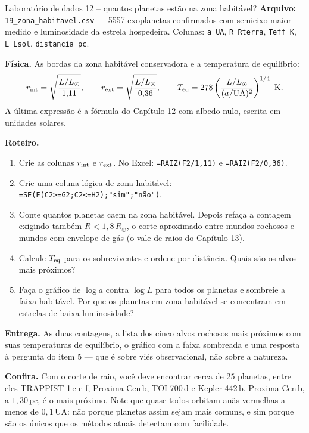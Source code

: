 \documentclass[11pt,a4paper]{article}
\begin{document}
\begin{lessonblock}[borderline west={2pt}{0pt}{astroGold}]{Laboratório de dados 12 -- quantos planetas estão na zona habitável?}
\textbf{Arquivo:} \texttt{19\_zona\_habitavel.csv} --- 5557 exoplanetas confirmados com semieixo maior medido e luminosidade da estrela hospedeira. Colunas: \texttt{a\_UA}, \texttt{R\_Rterra}, \texttt{Teff\_K}, \texttt{L\_Lsol}, \texttt{distancia\_pc}.

\textbf{Física.} As bordas da zona habitável conservadora e a temperatura de equilíbrio:
\[
r_{\rm int}=\sqrt{\frac{L/L_\odot}{1{,}11}},\qquad
r_{\rm ext}=\sqrt{\frac{L/L_\odot}{0{,}36}},\qquad
T_{\rm eq}=278\left(\frac{L/L_\odot}{(a/\mathrm{UA})^{2}}\right)^{1/4}\ \mathrm{K}.
\]
A última expressão é a fórmula do Capítulo 12 com albedo nulo, escrita em unidades solares.

\textbf{Roteiro.}
\begin{enumerate}
\item Crie as colunas $r_{\rm int}$ e $r_{\rm ext}$. No Excel: \texttt{=RAIZ(F2/1,11)} e \texttt{=RAIZ(F2/0,36)}.
\item Crie uma coluna lógica de zona habitável: \texttt{=SE(E(C2>=G2;C2<=H2);"sim";"não")}.
\item Conte quantos planetas caem na zona habitável. Depois refaça a contagem exigindo também $R<1{,}8\,R_\oplus$, o corte aproximado entre mundos rochosos e mundos com envelope de gás (o vale de raios do Capítulo 13).
\item Calcule $T_{\rm eq}$ para os sobreviventes e ordene por distância. Quais são os alvos mais próximos?
\item Faça o gráfico de $\log a$ contra $\log L$ para todos os planetas e sombreie a faixa habitável. Por que os planetas em zona habitável se concentram em estrelas de baixa luminosidade?
\end{enumerate}

\textbf{Entrega.} As duas contagens, a lista dos cinco alvos rochosos mais próximos com suas temperaturas de equilíbrio, o gráfico com a faixa sombreada e uma resposta à pergunta do item 5 --- que é sobre viés observacional, não sobre a natureza.

\textbf{Confira.} Com o corte de raio, você deve encontrar cerca de $25$ planetas, entre eles TRAPPIST-1\,e e f, Proxima Cen\,b, TOI-700\,d e Kepler-442\,b. Proxima Cen\,b, a $1{,}30\,\mathrm{pc}$, é o mais próximo. Note que quase todos orbitam anãs vermelhas a menos de $0{,}1\,\mathrm{UA}$: não porque planetas assim sejam mais comuns, e sim porque são os únicos que os métodos atuais detectam com facilidade.
\end{lessonblock}
\end{document}
